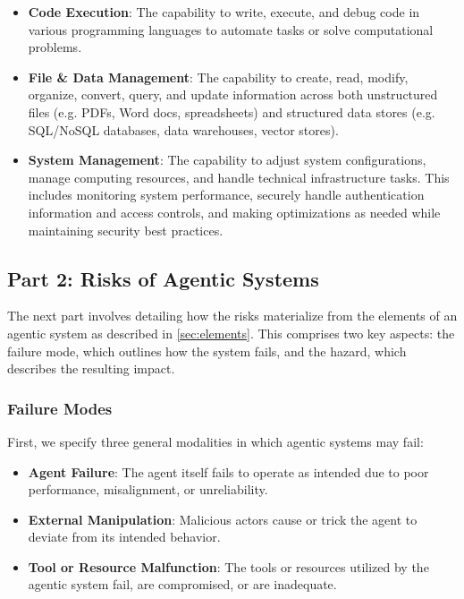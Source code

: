 \documentclass{article}
\begin{document}
\begin{itemize}

    \item \textbf{Code Execution}: The capability to write, execute, and debug code in various programming languages to automate tasks or solve computational problems. 

    \item \textbf{File \& Data Management}: The capability to create, read, modify, organize, convert, query, and update information across both unstructured files (e.g. PDFs, Word docs, spreadsheets) and structured data stores (e.g. SQL/NoSQL databases, data warehouses, vector stores). 

    \item \textbf{System Management}: The capability to adjust system configurations, manage computing resources, and handle technical infrastructure tasks. This includes monitoring system performance, securely handle authentication information and access controls, and making optimizations as needed while maintaining security best practices. 
    
\end{itemize}

\subsection{Part 2: Risks of Agentic Systems}

The next part involves detailing how the risks materialize from the elements of an agentic system as described in \ref{sec:elements}. This comprises two key aspects: the failure mode, which outlines how the system fails, and the hazard, which describes the resulting impact.

\subsubsection{Failure Modes}

First, we specify three general modalities in which agentic systems may fail:

\begin{itemize}
    \item \textbf{Agent Failure}: The agent itself fails to operate as intended due to poor performance, misalignment, or unreliability.
    \item \textbf{External Manipulation}: Malicious actors cause or trick the agent to deviate from its intended behavior.
    \item \textbf{Tool or Resource Malfunction}: The tools or resources utilized by the agentic system fail, are compromised, or are inadequate.
\end{itemize}
\end{document}
